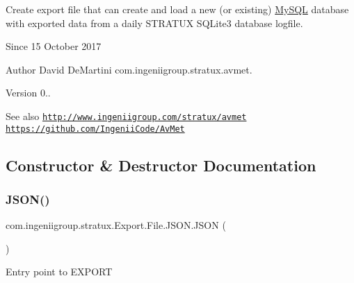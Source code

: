 Create export file that can create and load a new (or existing) \hyperlink{classcom_1_1ingeniigroup_1_1stratux_1_1_export_1_1_file_1_1_my_s_q_l}{My\+S\+QL} database with exported data from a daily S\+T\+R\+A\+T\+UX S\+Q\+Lite3 database logfile.

\begin{DoxySince}{Since}
15 October 2017 
\end{DoxySince}
\begin{DoxyAuthor}{Author}
David De\+Martini  com.\+ingeniigroup.\+stratux.\+avmet. 
\end{DoxyAuthor}
\begin{DoxyVersion}{Version}
0.. 
\end{DoxyVersion}
\begin{DoxySeeAlso}{See also}
\href{http://www.ingeniigroup.com/stratux/avmet}{\tt http\+://www.\+ingeniigroup.\+com/stratux/avmet}  \href{https://github.com/IngeniiCode/AvMet}{\tt https\+://github.\+com/\+Ingenii\+Code/\+Av\+Met} 
\end{DoxySeeAlso}


\subsection{Constructor \& Destructor Documentation}
\mbox{\label{classcom_1_1ingeniigroup_1_1stratux_1_1_export_1_1_file_1_1_j_s_o_n_a191db285aa2a014a6b1150d4d9cc8e7e}} 
\subsubsection{\texorpdfstring{J\+S\+O\+N()}{JSON()}\hspace{0.1cm}{\footnotesize\ttfamily [1/4]}}
{\footnotesize\ttfamily com.\+ingeniigroup.\+stratux.\+Export.\+File.\+J\+S\+O\+N.\+J\+S\+ON (\begin{DoxyParamCaption}{ }\end{DoxyParamCaption})}

Entry point to E\+X\+P\+O\+RT


